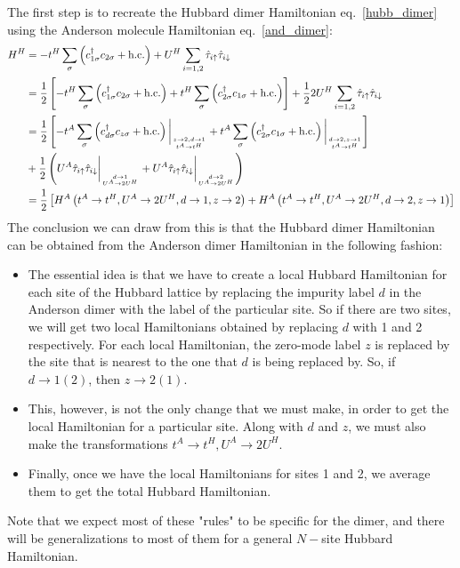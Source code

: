 \documentclass{article}
\numberwithin{equation}{section}
\begin{document}
The first step is to recreate the Hubbard dimer Hamiltonian eq.~\ref{hubb_dimer} using the Anderson molecule Hamiltonian eq.~\ref{and_dimer}:
\begin{equation}\begin{aligned}
	H^H &= -t^H\sum_{\sigma}\left(c^\dagger_{1\sigma}c_{2\sigma} + \text{h.c.}\right) + U^H\sum_{i=1,2}\hat \tau_{i \uparrow}\hat \tau_{i \downarrow}\\
	    &= \frac{1}{2}\left[-t^H\sum_{\sigma}\left(c^\dagger_{1\sigma}c_{2\sigma} + \text{h.c.}\right) + t^H\sum_{\sigma}\left(c^\dagger_{2\sigma}c_{1\sigma} + \text{h.c.}\right)\right] + \frac{1}{2} 2U^H\sum_{i=1,2}\hat \tau_{i \uparrow}\hat \tau_{i \downarrow}\\
	    &= \frac{1}{2}\left[-t^A\sum_{\sigma}\left(c^\dagger_{d\sigma}c_{z\sigma} + \text{h.c.}\right)\bigg\vert_{z \to 2, d \to 1\atop{t^A \to t^H}} + t^A\sum_{\sigma}\left(c^\dagger_{2\sigma}c_{1\sigma} + \text{h.c.}\right)\bigg\vert_{d \to 2,z \to 1\atop{t^A \to t^H}} \right] \\
	    &+ \frac{1}{2} \left(U^A\hat \tau_{i \uparrow}\hat \tau_{i \downarrow}\bigg\vert_{d \to 1\atop{U^A \to 2U^H}} + U^A\hat \tau_{i \uparrow}\hat \tau_{i \downarrow}\bigg\vert_{d \to 2\atop{U^A \to 2U^H}}\right)\\
	    &=\frac{1}{2}\left[H^A\left(t^A \to t^H, U^A \to 2U^H, d \to 1, z \to 2\right) + H^A\left(t^A \to t^H, U^A \to 2U^H, d \to 2, z \to 1\right)\right]
\end{aligned}\end{equation}
The conclusion we can draw from this is that the Hubbard dimer Hamiltonian can be obtained from the Anderson dimer Hamiltonian in the following fashion:
\begin{itemize}
	\item The essential idea is that we have to create a local Hubbard Hamiltonian for each site of the Hubbard lattice by replacing the impurity label \(d\) in the Anderson dimer with the label of the particular site. So if there are two sites, we will get two local Hamiltonians obtained by replacing \(d\) with 1 and 2 respectively. For each local Hamiltonian, the zero-mode label \(z\) is replaced by the site that is nearest to the one that \(d\) is being replaced by. So, if \(d \to 1(2)\), then \(z \to 2(1)\).
	\item This, however, is not the only change that we must make, in order to get the local Hamiltonian for a particular site. Along with \(d\) and \(z\), we must also make the transformations \(t^A \to t^H, U^A \to 2U^H\).
	\item Finally, once we have the local Hamiltonians for sites 1 and 2, we average them to get the total Hubbard Hamiltonian.
\end{itemize}
Note that we expect most of these "rules" to be specific for the dimer, and there will be generalizations to most of them for a general \(N-\)site Hubbard Hamiltonian.
\end{document}
